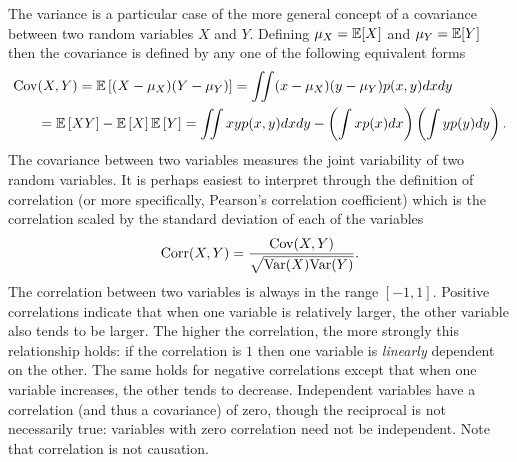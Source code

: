 The variance is a particular case of the more general concept of  a covariance between
two random variables $X$ and $Y$.  Defining $\mu_X=\mathbb{E} [X]$ and $\mu_Y=\mathbb{E} [Y]$
then the covariance is defined by any one of the following equivalent forms
\begin{align}
\operatorname{Cov}& (X,Y) = \mathbb{E} \left[(X-\mu_X)(Y-\mu_Y)\right] = \iint (x-\mu_X)(y-\mu_Y) p(x,y) dxdy \nonumber \\
&= \mathbb{E} \left[XY\right]-\mathbb{E} \left[X\right]\mathbb{E} \left[Y\right] = \iint xyp(x,y) dxdy - \left(\int xp(x) dx\right)
\left(\int yp(y) dy\right).
\end{align}
The covariance between two variables measures the joint variability of two random
variables.  It is perhaps easiest to interpret through the definition of correlation
(or more specifically, Pearson's correlation coefficient) which is the correlation
scaled by the standard deviation of each of the variables
\begin{align}
\operatorname{Corr} (X,Y) = \frac{\operatorname{Cov} (X,Y)}{\sqrt{\mathrm{Var}(X) \mathrm{Var}(Y)}}.
\end{align}
The correlation between two variables is always in the range $[-1,1]$.  Positive
correlations indicate that when one variable is relatively larger, the other variable
also tends to be larger.  The higher the correlation, the more strongly this relationship
holds: if the correlation is $1$ then one variable is \emph{linearly} dependent on the other.  The
same holds for negative correlations except that when one variable increases, the other tends
to decrease.  Independent variables have a correlation (and thus a covariance) of zero, though the
reciprocal is not necessarily true: variables with zero correlation need not be independent.
Note that correlation is not causation.